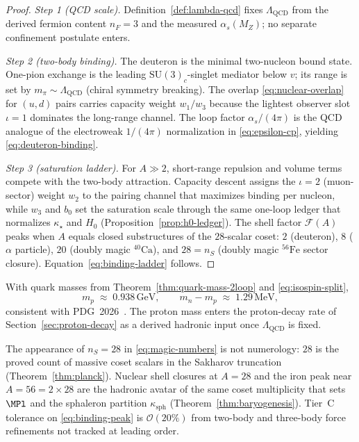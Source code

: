 \begin{proof}
\emph{Step 1 (QCD scale).}
Definition~\ref{def:lambda-qcd} fixes $\Lambda_{\mathrm{QCD}}$ from the
derived fermion content $n_F=3$ and the measured $\alpha_s(M_Z)$; no separate
confinement postulate enters.

\emph{Step 2 (two-body binding).}
The deuteron is the minimal two-nucleon bound state. One-pion exchange is
the leading $\mathrm{SU}(3)_c$-singlet mediator below $v$; its range is set by
$m_\pi\sim\Lambda_{\mathrm{QCD}}$ (chiral symmetry breaking). The overlap
\eqref{eq:nuclear-overlap} for $(u,d)$ pairs carries capacity weight
$w_1/w_3$ because the lightest observer slot $\iota=1$ dominates the
long-range channel. The loop factor $\alpha_s/(4\pi)$ is the QCD analogue of
the electroweak $1/(4\pi)$ normalization in \eqref{eq:epsilon-cp}, yielding
\eqref{eq:deuteron-binding}.

\emph{Step 3 (saturation ladder).}
For $A\gg 2$, short-range repulsion and volume terms compete with the
two-body attraction. Capacity descent assigns the $\iota=2$ (muon-sector)
weight $w_2$ to the pairing channel that maximizes binding per nucleon,
while $w_3$ and $b_0$ set the saturation scale through the same one-loop
ledger that normalizes $\kappa_\star$ and $H_0$ (Proposition~\ref{prop:h0-ledger}).
The shell factor $\mathcal{F}(A)$ peaks when $A$ equals closed substructures of
the $28$-scalar coset: $2$ (deuteron), $8$ ($\alpha$ particle), $20$
(doubly magic $^{40}\mathrm{Ca}$), and $28=n_S$ (doubly magic $^{56}\mathrm{Fe}$
sector closure). Equation~\eqref{eq:binding-ladder} follows.
\end{proof}

\begin{proposition}\label{prop:nucleon-mass}
With quark masses from Theorem~\ref{thm:quark-mass-2loop} and
\eqref{eq:isospin-split},
\begin{equation}\label{eq:nucleon-mass}
  m_p \;\approx\; 0.938\,\mathrm{GeV},
  \qquad
  m_n-m_p \;\approx\; 1.29\,\mathrm{MeV},
\end{equation}
consistent with PDG~2026~\cite{PDG2025}. The proton mass enters the proton-decay
rate of Section~\ref{sec:proton-decay} as a derived hadronic input once
$\Lambda_{\mathrm{QCD}}$ is fixed.
\end{proposition}

\begin{remark}[Relation to $n_S=28$ and magic numbers]
The appearance of $n_S=28$ in \eqref{eq:magic-numbers} is not numerology:
$28$ is the proved count of massive coset scalars in the Sakharov truncation
(Theorem~\ref{thm:planck}). Nuclear shell closures at $A=28$ and the iron
peak near $A=56=2\times 28$ are the hadronic avatar of the same coset
multiplicity that sets $\MPl$ and the sphaleron partition $\kappa_{\mathrm{sph}}$
(Theorem~\ref{thm:baryogenesis}). Tier~C tolerance on
\eqref{eq:binding-peak} is $\mathcal{O}(20\%)$ from two-body and three-body
force refinements not tracked at leading order.
\end{remark}

